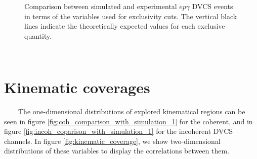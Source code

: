 \begin{figure}[h!]
\caption{Comparison between simulated and experimental $ep\gamma$ DVCS events in terms of the variables used for exclusivity cuts. The vertical black lines indicate the theoretically expected values for each exclusive quantity.} 
\label{fig:incoh_comparison_with_simulation_exclusive_2}
\end{figure}

~\newpage
~\newpage
\section{Kinematic coverages}
~~~~The one-dimensional distributions of explored kinematical regions can be 
seen in figure \ref{fig:coh_comparison_with_simulation_1} for the coherent, and 
in figure \ref{fig:incoh_coparison_with_simulation_1} for the incoherent DVCS 
channels. In figure \ref{fig:kinematic_coverage}, we show two-dimensional 
distributions of these variables to display the correlations between them. 

